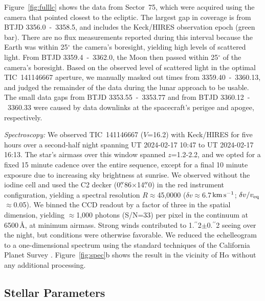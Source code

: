 \documentclass{nature3}
\newcommand{\farcs}{\mbox{\ensuremath{.\!\!^{\prime\prime}}}}%
\newcommand{\kms}{\ensuremath{\rm km\,s^{-1}}}
\begin{document}
\begin{methods}
Figure~\ref{fig:fulllc} shows the data from Sector~75, which were
acquired using the camera that pointed closest to the ecliptic.  The
largest gap in coverage is from BTJD 3356.0~-~3358.5, and includes
the Keck/HIRES observation epoch (green bar).   There are no flux
measurements reported during this interval because the Earth was
within 25$^\circ$ the camera's boresight, yielding high levels of
scattered light.  From BTJD 3359.4~-~3362.0, the Moon then passed
within 25$^\circ$ of the camera's boresight.  Based on the observed
level of scattered light in the optimal TIC~141146667 aperture, we
manually masked out times from 3359.40~-~3360.13, and judged the
remainder of the data during the lunar approach to be usable.  The
small data gaps from BTJD 3353.55~-~3353.77 and from BTJD
3360.12~-~3360.33 were caused by data downlinks at the spacecraft's
perigee and apogee, respectively.

{\it Spectroscopy:}
We observed TIC~141146667 ($V$=16.2) with Keck/HIRES for five hours over a
second-half night spanning UT 2024-02-17 10:47 to UT 2024-02-17
16:13.  The star's airmass over this window spanned $z$=1.2-2.2, and
we opted for a fixed 15 minute cadence over the entire sequence,
except for a final 10 minute exposure due to increasing sky
brightness at sunrise.  We observed without the iodine cell and used
the C2 decker (0$\farcs$86$\times$14$\farcs$0) in the red instrument
configuration, yielding a spectral resolution $R$$\approx$45{,}0000
($\delta v$$\approx$6.7\,\kms; $\delta v / v_{\rm
eq}$$\approx$0.05).  We binned the CCD readout by a factor of three
in the spatial dimension, yielding $\approx$1,000 photons (S/N=33)
per pixel in the continuum at 6500\,\AA, at minimum airmass.  Strong
winds contributed to 1\farcs2$\pm$0\farcs2 seeing over the night,
but conditions were otherwise favorable.  We reduced the
echelleogram to a one-dimensional spectrum using the standard
techniques of the California Planet Survey \cite{Howard2010}.
Figure~\ref{fig:spec}b shows the result in the vicinity of H$\alpha$
without any additional processing.


\subsection{Stellar Parameters}\phantom{+}
\label{subsec:stparams}


\end{methods}
\end{document}
